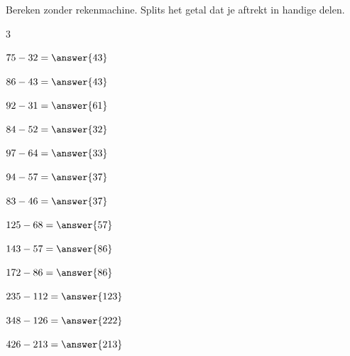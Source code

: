 \documentclass{ximera}
\begin{document}
\begin{oefening}{\oefB\ESS}

Bereken zonder rekenmachine. Splits het getal dat je aftrekt in handige delen.

\begin{multicols}{3}

\begin{question} \(75-32=\answer{43}\) \end{question}

\begin{question} \(86-43=\answer{43}\) \end{question}

\begin{question} \(92-31=\answer{61}\) \end{question}

\begin{question} \(84-52=\answer{32}\) \end{question}

\begin{question} \(97-64=\answer{33}\) \end{question}

\begin{question} \(94-57=\answer{37}\) \end{question}

\begin{question} \(83-46=\answer{37}\) \end{question}

\begin{question} \(125-68=\answer{57}\) \end{question}

\begin{question} \(143-57=\answer{86}\) \end{question}

\begin{question} \(172-86=\answer{86}\) \end{question}

\begin{question} \(235-112=\answer{123}\) \end{question}

\begin{question} \(348-126=\answer{222}\) \end{question}

\begin{question} \(426-213=\answer{213}\) \end{question}


\end{multicols}
\end{oefening}
\end{document}
